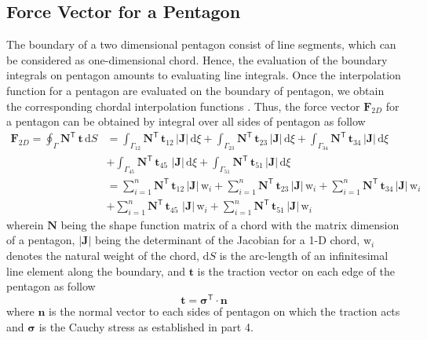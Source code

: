 \subsection{Force Vector for a Pentagon}
The boundary of a two dimensional pentagon consist of line segments, which can be considered as one-dimensional chord. Hence, the evaluation of the boundary integrals on pentagon amounts to evaluating line integrals. Once the interpolation function for a pentagon are evaluated on the boundary of pentagon, we obtain the corresponding chordal interpolation functions \cite{Reddy93}.
Thus, the force vector $\mathbf{F}_{2D}$  for a pentagon can be obtained by integral over all sides of pentagon as follow
\begin{equation}
\begin{aligned}
\mathbf{F}_{2D}  = \oint_{\Gamma} \mathbf{N}^{\mathsf{T}} \, \mathbf{t} \, \mathrm{d} S & = \int_{\Gamma_{12}} \mathbf{N}^{\mathsf{T}} \, \mathbf{t}_{12} \,|\mathbf{J}| \, \mathrm{d} \xi + \int_{\Gamma_{23}} \mathbf{N}^{\mathsf{T}} \, \mathbf{t}_{23} \,|\mathbf{J}| \, \mathrm{d} \xi + \int_{\Gamma_{34}} \mathbf{N}^{\mathsf{T}} \, \mathbf{t}_{34} \,|\mathbf{J}| \, \mathrm{d} \xi \\
& + \int_{\Gamma_{45}} \mathbf{N}^{\mathsf{T}} \, \mathbf{t}_{45} \, \,|\mathbf{J}| \, \mathrm{d} \xi + \int_{\Gamma_{51}} \mathbf{N}^{\mathsf{T}} \, \mathbf{t}_{51} \,|\mathbf{J}| \, \mathrm{d} \xi \\
& = \sum_{i=1}^{n} \mathbf{N}^{\mathsf{T}} \, \mathbf{t}_{12} \,|\mathbf{J}| \, \mathrm{w}_i + \sum_{i=1}^{n} \mathbf{N}^{\mathsf{T}} \, \mathbf{t}_{23} \,|\mathbf{J}| \, \mathrm{w}_i + \sum_{i=1}^{n} \mathbf{N}^{\mathsf{T}} \, \mathbf{t}_{34} \,|\mathbf{J}| \, \mathrm{w}_i \\
& + \sum_{i=1}^{n} \mathbf{N}^{\mathsf{T}} \, \mathbf{t}_{45} \, \,|\mathbf{J}| \, \mathrm{w}_i + \sum_{i=1}^{n} \mathbf{N}^{\mathsf{T}} \, \mathbf{t}_{51} \,|\mathbf{J}| \, \mathrm{w}_i
\end{aligned}
\end{equation}
wherein $\mathbf{N}$ being the shape function matrix of a chord with the matrix dimension of a pentagon, $|\mathbf{J}|$ being the determinant of the Jacobian for a 1-D chord, $\mathrm{w}_i$ denotes the natural weight of the chord, $\mathrm{d} S$ is the arc-length of an infinitesimal line element along the boundary, and $\mathbf{t}$ is the traction vector on each edge of the pentagon as follow
\begin{equation}
\mathbf{t} = \boldsymbol{\sigma}^{\mathsf{T}} \cdot \mathbf{n} 
\end{equation}
where $ \mathbf{n} $ is the normal vector to each sides of pentagon on which the traction acts and $ \boldsymbol{\sigma} $ is the Cauchy stress as established in part 4.

